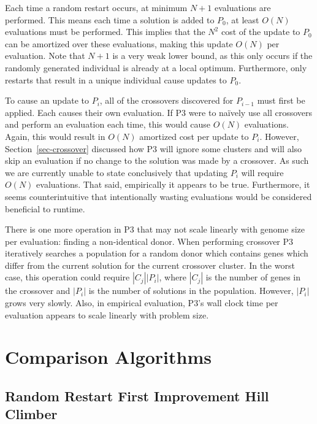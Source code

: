 \documentclass{sig-alternate}
\begin{document}
Each time a random restart occurs, at minimum $N+1$ evaluations are performed.
This means each time a solution is added to $P_0$, at least $O(N)$ evaluations
must be performed.  This implies that the $N^2$ cost of the update to $P_0$ can
be amortized over these evaluations, making this update $O(N)$ per evaluation.  Note
that $N+1$ is a very weak lower bound, as this only occurs if the randomly generated
individual is already at a local optimum.  Furthermore, only restarts that result
in a unique individual cause updates to $P_0$.

To cause an update to $P_i$, all of the crossovers discovered for
$P_{i-1}$ must first be applied.  Each causes their own evaluation.
If P3 were to na\"ively use all crossovers and perform an evaluation
each time, this would cause $O(N)$ evaluations.  Again, this would
result in $O(N)$ amortized cost per update to $P_i$.  However,
Section~\ref{sec-crossover} discussed how P3 will ignore some clusters
and will also skip an evaluation if no change to the solution was made
by a crossover.  As such we are currently unable to state conclusively
that updating $P_i$ will require $O(N)$ evaluations.  That said,
empirically it appears to be true.  Furthermore, it seems counterintuitive
that intentionally wasting evaluations would be considered beneficial
to runtime.

There is one more operation in P3 that may not scale linearly with
genome size per evaluation: finding a non-identical donor.  When
performing crossover P3 iteratively searches a population for a random
donor which contains genes which differ from the current solution for
the current crossover cluster.  In the worst case, this operation
could require $|C_j||P_i|$, where $|C_j|$ is the number of genes in
the crossover and $|P_i|$ is the number of solutions in the
population.  However, $|P_i|$ grows very slowly.  Also, in empirical
evaluation, P3's wall clock time per evaluation appears to scale
linearly with problem size.



\section{Comparison Algorithms}

\subsection{Random Restart First Improvement Hill Climber}
\end{document}
